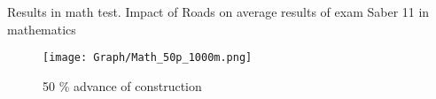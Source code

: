 \documentclass[9pt]{beamer}
\begin{document}
\begin{frame}{Results in math test. \hyperlink{result_math}{}} \label{50p_math}
Impact of Roads on average results of exam Saber 11 in mathematics
\begin{figure}
  \centering
  \texttt{[image: Graph/Math\_50p\_1000m.png]} 
  \caption{\small 50 \% advance of construction}
  \label{fig:6.1sub-first}
\end{figure}
\end{frame}
\end{document}

